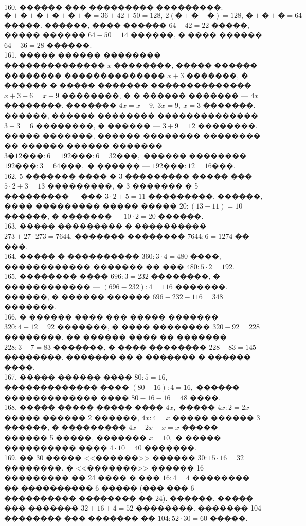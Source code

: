 \documentclass[12pt]{article}
\begin{document}
160. ������ ��� ��������� ���������: $\text{�}+\text{�}+\text{�}+\text{�}+\text{�}+\text{�}=36+42+50=128,\ 2(\text{�}+\text{�}+\text{�})=128,\ \text{�}+\text{�}+\text{�}=64$ �����. ������, ���� ������ $64-42=22$ �����, ����� ������ $64-50=14$ ������, � ���� ������ $64-36=28$ ������.\\
161. ����� ������ �������� �������������� $x$ ��������, ����� ������ �������� �������������� $x+3$ �������, � ������ � ����� ������� �������������� $x+3+6=x+9$ ��������, � � ������ ������� --- $4x$ ��������, ������� $4x=x+9,\ 3x=9,\ x=3$ �������. ������, ������ �������� �������������� $3+3=6$ ��������, � ������ --- $3+9=12$ ��������. ����� �������, ������ �������� �������� �� ������ ������ ������� $3\text{�}12\text{���}:6=192\text{���}:6=32\text{���},$ ������ �������� $192\text{���}:3=64\text{���},$ � ������ --- $192\text{���}:12=16\text{���}.$\\
162. 5 ������� ���� � 3 ��������� ����� ��� $5\cdot2+3=13$ ���������, � 3 ������� � 5 ��������� --- ��� $3\cdot2+5=11$ ���������. ������, ���� ��������� ����� ����� $20:(13-11)=10$ ������, � ������� --- $10\cdot2=20$ ������.\\
163. ����� ��������� � ���������� $273+27\cdot273=7644.$ ������� �������� $7644:6=1274$ �� ���.\\
164. ����� � ���������� $360:3\cdot4=480$ ����, ������������ ������� �� ��� $480:5\cdot2=192.$\\
165. �������� ���� $696:3=232$ ��������, � ������������ --- $(696-232):4=116$ �������. ������, � ������ ������ $696-232-116=348$ �������.\\
166. � ������ ���� ��� ����� ������� $320:4+12=92$ �������, � ���� �������� $320-92=228$ ��������. �� ������ ���� �� ������� $228:3+7=83$ �������, � ���� �������� $228-83=145$ ��������, ������� �� � ������� � ������ ����.\\
167. ����� ������ ���� $80:5=16,$ ������������� ���� $(80-16):4=16,$ ������ ������������� ���� $80-16-16=48$ ����.\\
168. ����� ����� ����� ���� $4x,$ ����� $4x:2=2x$ ����� ������ 2 ������, $4x:4=x$ ����� ������ 3 ������, � ��������� $4x-2x-x=x$ ����� ������ 5 �����, ������� $x=10,$ � ����� ���������� ���� $4\cdot10=40$ �������.\\
169. �� 30 ����� <<������>> ������ $30:15\cdot16=32$ ��������, � <<�������>> ������ 16 ��������� �� 24 ���� � ��� $16:4=4$ �������� �� ���������� 6 ����� (��� ��� 6 ���������� �������� �� 24). ������, ����� ��� ������� $32+16+4=52$ ��������. ������� 104 �������� ��� ������� �� $104:52\cdot30=60$ �����.\\
\end{document}
